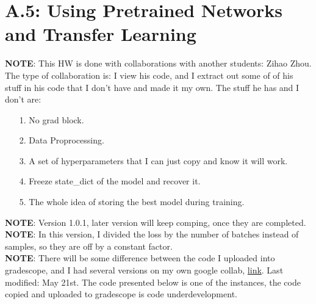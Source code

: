 \documentclass[]{article}
\begin{document}
\section*{A.5: Using Pretrained Networks and Transfer Learning}
    \textbf{NOTE}: This HW is done with collaborations with another students: Zihao Zhou. 
        \\
        The type of collaboration is: I view his code, and I extract out some of of his stuff in his code that I don't have and made it my own. The stuff he has and I don't are: 
        \begin{enumerate}
            \item[1.] No grad block.
            \item[2.] Data Proprocessing.
            \item[3.] A set of hyperparameters that I can just copy and know it will work.  
            \item[4.] Freeze state\_dict of the model and recover it. 
            \item[5.] The whole idea of storing the best model during training.  
        \end{enumerate}
        \textbf{NOTE}: Version 1.0.1, later version will keep comping, once they are completed. 
        \\
        \textbf{NOTE}: In this version, I divided the loss by the number of batches instead of samples, so they are off by a constant factor. 
        \\
        \textbf{NOTE}: There will be some difference between the code I uploaded into gradescope, and I had several versions on my own google collab, \href{https://colab.research.google.com/drive/1cCKCyvZBUQsXtfZfqKFic64mZy4l99be?usp=sharing}{link}. Last modified: May 21st. The code presented below is one of the instances, the code copied and uploaded to gradescope is code underdevelopment. 
\end{document}
